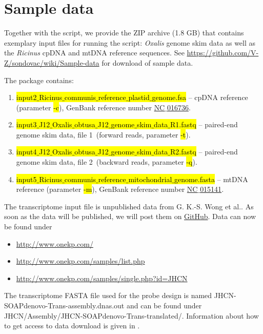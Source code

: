 \documentclass[a4paper, 11pt, twoside]{article}
\renewcommand{\texttt}[1]{\hl{\ttfamily #1}}
\begin{document}
\section{Sample data}

Together with the script, we provide the ZIP archive (1.8 GB) that contains exemplary input files for running the script: \textit{Oxalis} genome skim data as well as the \textit{Ricinus} cpDNA and mtDNA reference sequences. See \url{https://github.com/V-Z/sondovac/wiki/Sample-data} for download of sample data.

The package contains:

\begin{enumerate}
  \item \texttt{input2$\_$Ricinus$\_$communis$\_$reference$\_$plastid$\_$genome.fsa} -- cpDNA reference (para\-meter \texttt{-c}), GenBank reference number \href{http://www.ncbi.nlm.nih.gov/nuccore/372450118/}{NC$\_$016736}.
  \item \texttt{input3$\_$J12$\_$Oxalis$\_$obtusa$\_$J12$\_$genome$\_$skim$\_$data$\_$R1.fastq} -- paired-end genome sk\-im data, file 1~(forward reads, parameter \texttt{-t}).
  \item \texttt{input4$\_$J12$\_$Oxalis$\_$obtusa$\_$J12$\_$genome$\_$skim$\_$data$\_$R2.fastq} -- paired-end genome sk\-im data, file 2~(backward reads, parameter \texttt{-q}).
  \item \texttt{input5$\_$Ricinus$\_$communis$\_$reference$\_$mitochondrial$\_$genome.fasta} -- mtDNA reference (parameter \texttt{-m}), GenBank reference number \href{http://www.ncbi.nlm.nih.gov/nuccore/323649872/}{NC$\_$015141}.
\end{enumerate}

The transcriptome input file is unpublished data from G. K.-S. Wong et al.. As soon as the data will be published, we will post them on \href{https://github.com/V-Z/sondovac/wiki/Sample-data}{GitHub}. Data can now be found under

\begin{itemize}
  \item \url{http://www.onekp.com/}
  \item \url{http://www.onekp.com/samples/list.php}
  \item \url{http://www.onekp.com/samples/single.php?id=JHCN}
\end{itemize}

The transcriptome FASTA file used for the probe design is named JHCN-SOAPdenovo-Trans-assembly.dnas.out and can be found under JHCN/Assembly/JHCN-SOAPdenovo-Trans-translated/. Information about how to get access to data download is given in \citet{Matasci2014}.
\end{document}
